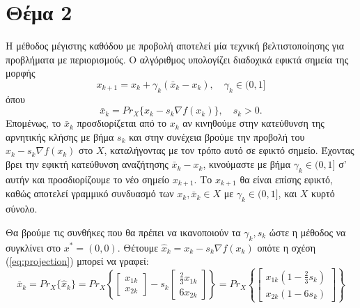 \documentclass[a4paper,12pt]{article}
\begin{document}
\section*{Θέμα 2}
Η μέθοδος μέγιστης καθόδου με προβολή αποτελεί μία τεχνική βελτιστοποίησης για προβλήματα με περιορισμούς.
Ο αλγόριθμος υπολογίζει διαδοχικά εφικτά σημεία της μορφής
\begin{equation}
    x_{k+1} = x_k + \gamma_k (\bar{x}_k - x_k), \quad \gamma_k \in (0, 1]
    \label{eq:projected_steepest_descend}
\end{equation}
όπου
\begin{equation}
    \bar{x}_k = Pr_X\{x_k - s_k \nabla f(x_k)\}, \quad s_k > 0.
    \label{eq:projection}
\end{equation}
Επομένως, το $\bar{x}_k$ προσδιορίζεται από το $x_k$ αν κινηθούμε στην κατεύθυνση της αρνητικής κλήσης με
βήμα $s_k$ και στην συνέχεια βρούμε την προβολή του $x_k - s_k \nabla f(x_k)$ στο $X$, καταλήγοντας με τον
τρόπο αυτό σε εφικτό σημείο. Έχοντας βρει την εφικτή κατεύθυνση αναζήτησης $\bar{x}_k - x_k$, κινούμαστε με
βήμα $\gamma_k \in (0, 1]$ σ' αυτήν και προσδιορίζουμε το νέο σημείο $x_{k+1}$. Το \(x_{k+1}\) θα είναι 
επίσης εφικτό, καθώς αποτελεί γραμμικό συνδυασμό των $x_k, \bar{x}_k \in X$ με $\gamma_k \in (0, 1]$, 
και $X$ κυρτό σύνολο.

Θα βρούμε τις συνθήκες που θα πρέπει να ικανοποιούν τα $\gamma_k, s_k$ ώστε η μέθοδος να συγκλίνει στο 
$x^* = (0, 0)$. Θέτουμε $\hat{x}_k = x_k - s_k \nabla f(x_k)$ οπότε η σχέση (\ref{eq:projection}) μπορεί να γραφεί:
\begin{equation}
    \bar{x}_k = Pr_X\{\hat{x}_k\} = Pr_X\left\{\begin{bmatrix} x_{1k} \\ x_{2k} \end{bmatrix} - 
    s_k \begin{bmatrix} \frac{2}{3} x_{1k} \\ 6 x_{2k} \end{bmatrix}\right\} = 
    Pr_X\left\{\begin{bmatrix} x_{1k} \left(1 - \frac{2}{3} s_k\right) \\ x_{2k} (1 - 6 s_k)\end{bmatrix} \right\}
\end{equation}
\end{document}
